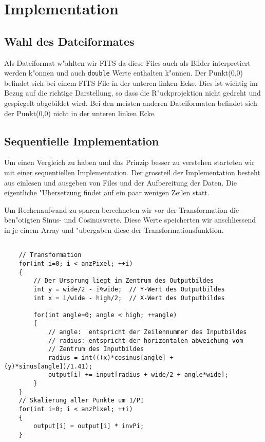 \section{Implementation}
\subsection{Wahl des Dateiformates}

Als Dateiformat w"ahlten wir FITS da diese Files auch als Bilder interpretiert werden k"onnen und auch \texttt{double}  Werte enthalten k"onnen. Der Punkt(0,0) befindet sich bei einem FITS File in der unteren linken Ecke. Dies ist wichtig im Bezug auf die richtige Darstellung, so dass die R"uckprojektion nicht gedreht und gespiegelt abgebildet wird. Bei den meisten anderen Dateiformaten befindet sich der Punkt(0,0) nicht in der unteren linken Ecke.

\subsection{Sequentielle Implementation}

Um einen Vergleich zu haben und das Prinzip besser zu verstehen
starteten wir mit einer sequentiellen Implementation. Der grossteil
der Implementation besteht aus einlesen und ausgeben von Files und der
Aufbereitung der Daten. Die eigentliche "Ubersetzung findet auf ein paar
wenigen Zeilen statt.

Um Rechenaufwand zu sparen berechneten wir vor der Transformation
die ben"otigten Sinus- und Cosinuswerte. Diese Werte speicherten
wir anschliessend in je einem Array und "ubergaben diese der
Transformationsfunktion.


\begin{lstlisting}

	// Transformation	
	for(int i=0; i < anzPixel; ++i)
	{
		// Der Ursprung liegt im Zentrum des Outputbildes		
		int y = wide/2 - i%wide;  // Y-Wert des Outputbildes
		int x = i/wide - high/2;  // X-Wert des Outputbildes
		
		for(int angle=0; angle < high; ++angle)
		{
			// angle:  entspricht der Zeilennummer des Inputbildes			
			// radius: entspricht der horizontalen abweichung vom 
			// Zentrum des Inputbildes			
			radius = int(((x)*cosinus[angle] + (y)*sinus[angle])/1.41);
			output[i] += input[radius + wide/2 + angle*wide];
		}
	}
	// Skalierung aller Punkte um 1/PI	
	for(int i=0; i < anzPixel; ++i)
	{
		output[i] = output[i] * invPi;
 	}

\end{lstlisting}

